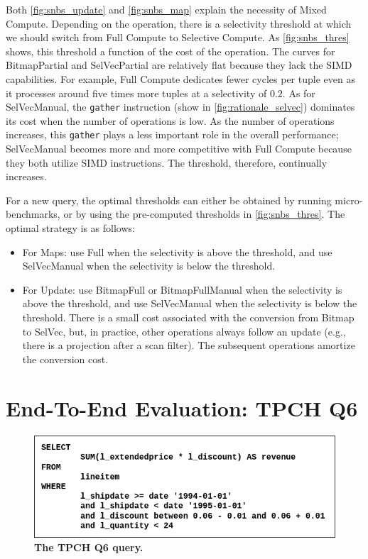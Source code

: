 \documentclass[12pt]{cmuthesis}
\begin{document}
Both \cref{fig:snbs_update} and \cref{fig:snbs_map} explain the necessity of Mixed Compute. Depending on the operation, there is a selectivity threshold at which we should switch from Full Compute to Selective Compute. As \cref{fig:snbs_thres} shows, this threshold a function of the cost of the operation. The curves for BitmapPartial and SelVecPartial are relatively flat because they lack the SIMD capabilities. For example, Full Compute dedicates fewer cycles per tuple even as it processes around five times more tuples at a selectivity of $0.2$. As for SelVecManual, the \texttt{gather} instruction (show in \cref{fig:rationale_selvec}) dominates its cost when the number of operations is low. As the number of operations increases, this \texttt{gather} plays a less important role in the overall performance; SelVecManual becomes more and more competitive with Full Compute because they both utilize SIMD instructions. The threshold, therefore, continually increases.

For a new query, the optimal thresholds can either be obtained by running micro-benchmarks, or by using the pre-computed thresholds in \cref{fig:snbs_thres}. The optimal strategy is as follows: 
\begin{itemize}
\item For Maps: use Full when the selectivity is above the threshold, and use SelVecManual when the selectivity is below the threshold.
\item For Update: use BitmapFull or BitmapFullManual when the selectivity is above the threshold, and use SelVecManual when the selectivity is below the threshold. There is a small cost associated with the conversion from Bitmap to SelVec, but, in practice, other operations always follow an update (e.g., there is a projection after a scan filter). The subsequent operations amortize the conversion cost.
\end{itemize}


\section{End-To-End Evaluation: TPCH Q6}
\begin{figure}[t!]
    \centering
    \includegraphics[scale=0.5]{images/Q6.png}
    \caption{\textbf{The TPCH Q6 query.}}
    \label{fig:tpch_q6}
\end{figure}
\end{document}

